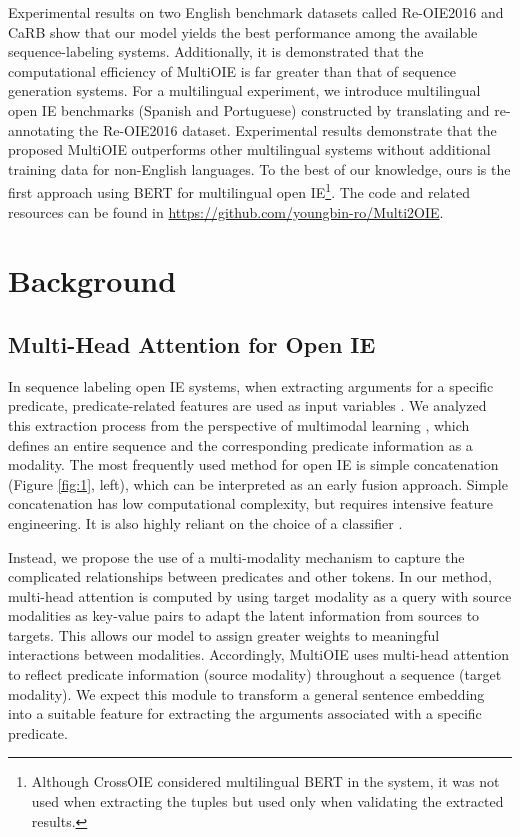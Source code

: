 \documentclass[11pt,a4paper]{article}
\begin{document}
Experimental results on two English benchmark datasets called Re-OIE2016 \citep{Zhan2019SpanMF} and CaRB \citep{bhardwaj-etal-2019-carb} show that our model yields the best performance among the available sequence-labeling systems.
Additionally, it is demonstrated that the computational efficiency of MultiOIE is far greater than that of sequence generation systems.
For a multilingual experiment, we introduce multilingual open IE benchmarks (Spanish and Portuguese) constructed by translating and re-annotating the Re-OIE2016 dataset.
Experimental results demonstrate that the proposed MultiOIE outperforms other multilingual systems without additional training data for non-English languages.
To the best of our knowledge, ours is the first approach using BERT for multilingual open IE\footnote{Although CrossOIE \citep{Cabral2020CrossOIE} considered multilingual BERT in the system, it was not used when extracting the tuples but used only when validating the extracted results.}.
The code and related resources can be found in \url{https://github.com/youngbin-ro/Multi2OIE}.

\section{Background}
\subsection{Multi-Head Attention for Open IE}
In sequence labeling open IE systems, when extracting arguments for a specific predicate, predicate-related features are used as input variables \citep{stanovsky-etal-2018-supervised,Zhan2019SpanMF,jia2019hybrid}.
We analyzed this extraction process from the perspective of multimodal learning \citep{Mangai2010ASO,10.5555/3104482.3104569,10.1109/TPAMI.2018.2798607}, which defines an entire sequence and the corresponding predicate information as a modality.
The most frequently used method for open IE is simple concatenation (Figure \ref{fig:1}, left), which can be interpreted as an early fusion approach.
Simple concatenation has low computational complexity, but requires intensive feature engineering.
It is also highly reliant on the choice of a classifier \citep{doi:10.1142/S1793351X16400158,Liu2018LearnTC}.

Instead, we propose the use of a multi-modality mechanism \citep{tsai-etal-2019-multimodal} to capture the complicated relationships between predicates and other tokens. In our method, multi-head attention is computed by using target modality as a query with source modalities as key-value pairs to adapt the latent information from sources to targets.
This allows our model to assign greater weights to meaningful interactions between modalities.
Accordingly, MultiOIE uses multi-head attention to reflect predicate information (source modality) throughout a sequence (target modality).
We expect this module to transform a general sentence embedding into a suitable feature for extracting the arguments associated with a specific predicate.
\end{document}
